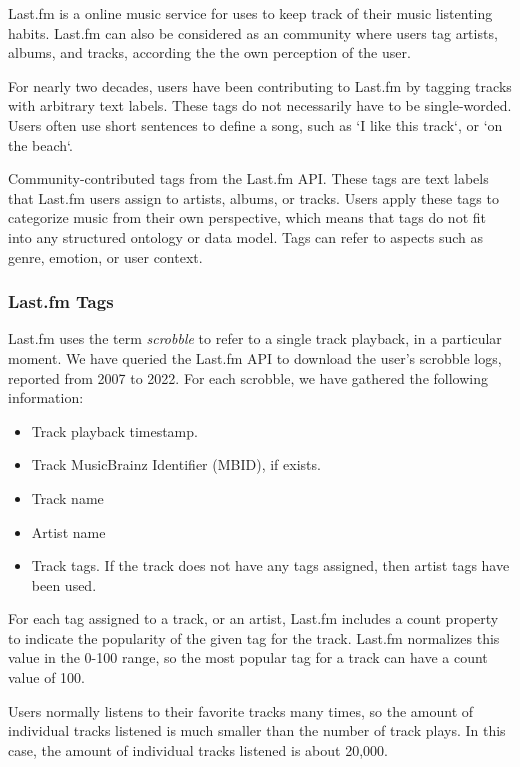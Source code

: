 \documentclass[fleqn,10pt]{olplainarticle}
\begin{document}
Last.fm is a online music service for uses to keep track of their music listenting habits.
Last.fm can also be considered as an community where users tag artists, albums, and tracks, according the the own perception of the user.

For nearly two decades, users have been contributing to Last.fm by tagging tracks with arbitrary text labels.
These tags do not necessarily have to be single-worded.
Users often use short sentences to define a song, such as `I like this track`, or `on the beach`.

Community-contributed tags from the Last.fm API.
These tags are text labels that Last.fm users assign
to artists, albums, or tracks. Users apply these tags to
categorize music from their own perspective, which
means that tags do not fit into any structured ontology
or data model. Tags can refer to aspects such as genre,
emotion, or user context.

\subsubsection*{Last.fm Tags}
Last.fm uses the term \emph{scrobble} to refer to a single track playback,
in a particular moment. We have queried the Last.fm
API to download the user{'}s scrobble logs, reported from 2007 to 2022.
For each scrobble, we have gathered the following information:

\begin{itemize}
     \item Track playback timestamp.
     \item Track MusicBrainz Identifier (MBID), if exists.
     \item Track name
     \item Artist name
     \item Track tags. If the track does not have any tags assigned,
      then artist tags have been used.
\end{itemize}


For each tag assigned to a track, or an artist, Last.fm includes
a count property to indicate the popularity of the given tag for the track.
Last.fm normalizes this value in the 0-100 range, so the most popular tag for a track can have a
count value of 100.

Users normally listens to their favorite tracks many times,
so the amount of individual tracks listened is much smaller
than the number of track plays. In this case, the amount of
individual tracks listened is about 20,000.
\end{document}
